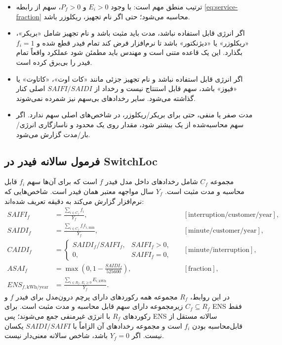 \documentclass[11pt,a4paper,oneside]{book}
\begin{document}
\begin{itemize}
\item ترتیب منطق مهم است: با وجود $E_i>0$ و $P_f>0$، سهم از رابطه \eqref{eq:service-fraction} محاسبه می‌شود؛ حتی اگر نام تجهیز، ریکلوزر باشد.
\item اگر انرژی قابل استفاده نباشد، مدت باید مثبت باشد و نام تجهیز شامل «بریکر»، «ریکلوزر» یا «دیژنکتور» باشد تا نرم‌افزار فرض کند تمام فیدر قطع شده و $f_i=1$ بگذارد. این یک قاعده متنی است و مهندس باید مطمئن شود عملکرد واقعاً تمام فیدر را بی‌برق کرده است.
\item اگر انرژی قابل استفاده نباشد و نام تجهیز جزئی مانند «کات اوت»، «کاتاوت» یا «فیوز» باشد، سهم قابل استنتاج نیست و رخداد از $SAIFI/SAIDI$ اصلی کنار گذاشته می‌شود. سایر رخدادهای بی‌سهم نیز شمرده نمی‌شوند.
\item مدت صفر یا منفی، حتی برای بریکر/ریکلوزر، در شاخص‌های اصلی سهم ندارد. اگر سهم محاسبه‌شده از یک بیشتر شود، مقدار روی یک محدود و ناسازگاری انرژی/بار/مدت گزارش می‌شود.
\end{itemize}

\subsection{فرمول سالانه فیدر در SwitchLoc}
مجموعه $C_f$ شامل رخدادهای داخل مدل فیدر $f$ است که برای آن‌ها سهم $f_i$ قابل محاسبه و مدت مثبت است. $Y_f$ سال مواجهه معتبر همان فیدر است. شاخص‌هایی که نرم‌افزار گزارش می‌کند به دقیقه تعریف شده‌اند:
\begin{align}
 SAIFI_f&=\frac{\sum_{i\in C_f}f_i}{Y_f},
 &&[\mathrm{interruption/customer/year}],\label{eq:saifi}\\
 SAIDI_f&=\frac{\sum_{i\in C_f}f_i t_{i,\mathrm{min}}}{Y_f},
 &&[\mathrm{minute/customer/year}],\label{eq:saidi}\\
 CAIDI_f&=\begin{cases}SAIDI_f/SAIFI_f,&SAIFI_f>0,\\0,&SAIFI_f=0,\end{cases}
 &&[\mathrm{minute/interruption}],\label{eq:caidi}\\
 ASAI_f&=\max\left(0,1-\frac{SAIDI_f}{525600}\right),
 &&[\mathrm{fraction}],\label{eq:asai}\\
 ENS_{f,\mathrm{kWh/year}}&=\frac{\sum_{i\in R_f,\,E_i\geq0}E_{i,\mathrm{kWh}}}{Y_f}.
 \label{eq:service-ens}
\end{align}
در این روابط، $R_f$ مجموعه همه رکوردهای دارای پرچم درون‌مدل برای فیدر $f$ و $C_f\subseteq R_f$ زیرمجموعه دارای سهم قابل محاسبه و مدت مثبت است. برای ENS فقط رکوردهای $R_f$ با انرژی غیرمنفی جمع می‌شوند؛ پس ENS سالانه مستقل از قابل‌محاسبه بودن $f_i$ است و مجموعه رخدادهای آن الزاماً با $SAIDI/SAIFI$ یکسان نیست. اگر $Y_f=0$ باشد، شاخص سالانه معنی‌دار نیست.
\end{document}
